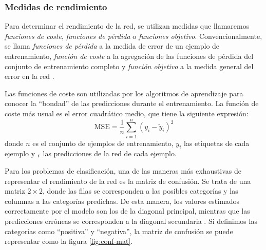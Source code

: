 \subsubsection*{Medidas de rendimiento}

Para determinar el rendimiento de la red, se utilizan medidas que llamaremos \textit{funciones de coste}, 
\textit{funciones de pérdida} o \textit{funciones objetivo}. Convencionalmente, se llama \textit{funciones de pérdida} 
a la medida de error de un ejemplo de entrenamiento, \textit{función de coste} a la agregación de las funciones de 
pérdida del conjunto de entrenamiento completo y \textit{función objetivo} a la medida general del error en la red 
\cite{mlp}. 

\vspace{10pt}
Las funciones de coste son utilizadas por los algoritmos de aprendizaje para conocer la ``bondad'' de las predicciones 
durante el entrenamiento. La función de coste más usual es el error cuadrático medio, que tiene la siguiente expresión:
\begin{equation}
    \text{MSE}=\frac 1n\sum_{i=1}^n(y_i-\tilde{y}_i)^2
\end{equation}
donde $n$ es el conjunto de ejemplos de entrenamiento, $y_i$ las etiquetas de cada ejemplo y $\title{y}_i$ las 
predicciones de la red de cada ejemplo.

\vspace{10pt}
Para los problemas de clasificación, una de las maneras más exhaustivas de representar el rendimiento de la red es la
matriz de confusión. Se trata de una matriz $2\times 2$, donde las filas se corresponden a las posibles categorías y
las columnas a las categorías predichas. De esta manera, los valores estimados correctamente por el modelo son los de 
la diagonal principal, mientras que las predicciones erróneas se corresponden a la diagonal secundaria 
\cite{muller_guido_2017}. Si definimos las categorías como ``positiva'' y ``negativa'', la matriz de confusión se puede 
representar como la figura \ref{fig:conf-mat}. 

